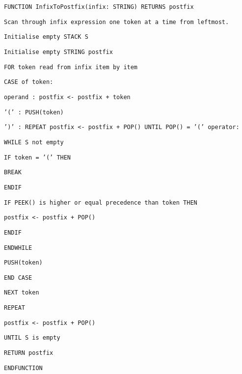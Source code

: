 \noindent %
\noindent\begin{minipage}[t]{1\columnwidth}%
\texttt{FUNCTION InfixToPostfix(infix: STRING) RETURNS postfix }

\texttt{\qquad{}Scan through infix expression one token at a time
from leftmost. }

\texttt{\qquad{}Initialise empty STACK S }

\texttt{\qquad{}Initialise empty STRING postfix }

\texttt{FOR token read from infix item by item }

\texttt{\qquad{}\qquad{}CASE of token: }

\texttt{\qquad{}\qquad{}\qquad{}operand : postfix <- postfix +
token}

\texttt{\qquad{}\qquad{}\qquad{}'(' : PUSH(token) }

\texttt{\qquad{}\qquad{}\qquad{}')' : REPEAT postfix <- postfix
+ POP() UNTIL POP() = '(' operator:}

\texttt{\qquad{}\qquad{}\qquad{}\qquad{}WHILE S not empty }

\texttt{\qquad{}\qquad{}\qquad{}\qquad{}\qquad{}IF token = '('
THEN }

\texttt{\qquad{}\qquad{}\qquad{}\qquad{}\qquad{}\qquad{}BREAK }

\texttt{\qquad{}\qquad{}\qquad{}\qquad{}\qquad{}ENDIF }

\texttt{\qquad{}\qquad{}\qquad{}\qquad{}\qquad{}IF PEEK() is
higher or equal precedence than token THEN }

\texttt{\qquad{}\qquad{}\qquad{}\qquad{}\qquad{}\qquad{}postfix
<- postfix + POP() }

\texttt{\qquad{}\qquad{}\qquad{}\qquad{}\qquad{}ENDIF }

\texttt{\qquad{}\qquad{}\qquad{}\qquad{}ENDWHILE }

\texttt{\qquad{}\qquad{}\qquad{}\qquad{}PUSH(token) }

\texttt{\qquad{}\qquad{}END CASE }

\texttt{\qquad{}NEXT token }

\texttt{\qquad{}REPEAT }

\texttt{\qquad{}\qquad{}postfix <- postfix + POP() }

\texttt{\qquad{}UNTIL S is empty }

\texttt{\qquad{}RETURN postfix }

\texttt{ENDFUNCTION }%
\end{minipage}
